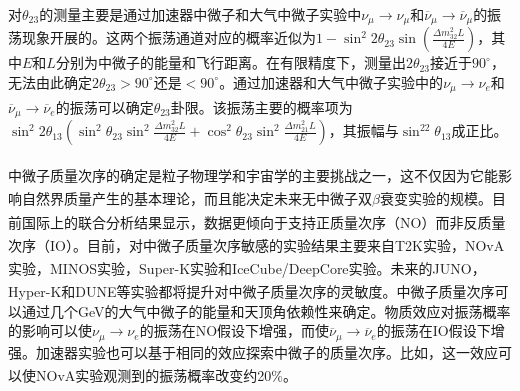\documentclass[a4paper,zihao=-4]{article}
\newcommand{\citess}[1]{\textsuperscript{\cite{#1}}}
\begin{document}
\paragraph{}对$\theta_{23}$的测量主要是通过加速器中微子和大气中微子实验中$\nu_\mu\to\nu_\mu$和$\overline{\nu}_\mu\to\overline{\nu}_\mu$的振荡现象开展的。这两个振荡通道对应的概率近似为$1-\sin ^2 2 \theta_{23} \sin \left(\frac{\Delta m_{32}^2 L}{4 E}\right)$，其中$E$和$L$分别为中微子的能量和飞行距离。在有限精度下，测量出$2\theta_{23}$接近于$90^\circ$，无法由此确定$2\theta_{23}>90^\circ$还是$<90^\circ$。通过加速器和大气中微子实验中的$\nu_\mu\to\nu_e$和$\overline{\nu}_\mu\to\overline{\nu}_e$的振荡可以确定$\theta_{23}$卦限\citess{Agarwalla:2013ju}。该振荡主要的概率项为$\sin ^2 2 \theta_{13} \left(\sin ^2 \theta_{23} \sin ^2 \frac{\Delta m_{32}^2 L}{4 E}+ \cos ^2 \theta_{23} \sin ^2 \frac{\Delta m_{21}^2 L}{4 E}\right)$，其振幅与$\sin^22\theta_{13}$成正比。

\paragraph{}中微子质量次序的确定是粒子物理学和宇宙学的主要挑战之一，这不仅因为它能影响自然界质量产生的基本理论，而且能决定未来无中微子双$\beta$衰变实验的规模\citess{Gariazzo:2022ahe}。目前国际上的联合分析\citess{Esteban:2020cvm,Kelly:2020fkv}结果显示，数据更倾向于支持正质量次序（NO）而非反质量次序（IO）。目前，对中微子质量次序敏感的实验结果主要来自T2K实验\citess{T2K:2021xwb}，NOvA实验\citess{NOvA:2021nfi}，MINOS实验\citess{2018npa..confE.423A}，Super-K实验\citess{Super-Kamiokande:2017yvm}和IceCube/DeepCore实验\citess{IceCube:2017lak}。未来的JUNO\citess{JUNO:2021vlw}，Hyper-K\citess{Hyper-Kamiokande:2022smq}和DUNE\citess{DUNE:2020fgq}等实验都将提升对中微子质量次序的灵敏度。中微子质量次序可以通过几个GeV的大气中微子的能量和天顶角依赖性来确定。物质效应对振荡概率的影响可以使$\nu_\mu\to\nu_e$的振荡在NO假设下增强，而使$\overline{\nu}_\mu\to\overline{\nu}_e$的振荡在IO假设下增强。加速器实验也可以基于相同的效应探索中微子的质量次序。比如，这一效应可以使NOvA实验观测到的振荡概率改变约20\%\citess{NOvA:2021nfi}。
\end{document}
